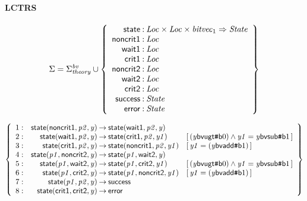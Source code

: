 \documentclass[a4paper]{article}
\newcommand{\ttsym}[1]{\mbox{\tt #1}}
\def\ttsharp{\ttsym{\symbol{35}}}
\newcommand{\Sort}[1]{\mathit{#1}}
\newcommand{\symb}[1]{\mathsf{#1}}
\newcommand{\var}[1]{\mathit{#1}}
\newcommand{\Constraint}[1]{[\, #1 \,]}
\newcommand{\bv}[2][b]{{\ttsharp\symb{#1}{#2}}}
\newcommand{\Sigmabvtheory}{\Sigma^{\mathit{bv}}_{\mathit{theory}}}
\begin{document}
\paragraph{LCTRS}

\[
\Sigma = 
\Sigmabvtheory \cup\left\{
\begin{array}{r@{\>}c@{\>}l}
\symb{state} & : & \Sort{Loc} \times \Sort{Loc} \times \Sort{bitvec}_{1} \Rightarrow \Sort{State}\\
\symb{noncrit1} & : & \Sort{Loc}\\
\symb{wait1} & : & \Sort{Loc}\\
\symb{crit1} & : & \Sort{Loc}\\
\symb{noncrit2} & : & \Sort{Loc}\\
\symb{wait2} & : & \Sort{Loc}\\
\symb{crit2} & : & \Sort{Loc}\\
\symb{success} & : & \Sort{State}\\
\symb{error} & : & \Sort{State}\\
\end{array}
\right\}
\]

\[
\left\{
\begin{array}{rr@{\>}c@{\>}ll}
\mathrm{1} : 
 & \symb{state}(\symb{noncrit1},\var{p2},\var{y})
 & \to 
 & \symb{state}(\symb{wait1},\var{p2},\var{y})\\

\mathrm{2} : 
 & \symb{state}(\symb{wait1},\var{p2},\var{y})
 & \to 
 & \symb{state}(\symb{crit1},\var{p2},\var{y1})
 & \Constraint{(\var{y} \symb{bvugt} \bv{0}) \land \var{y1} = \var{y} \symb{bvsub} \bv{1}}\\

\mathrm{3} : 
 & \symb{state}(\symb{crit1},\var{p2},\var{y})
 & \to 
 & \symb{state}(\symb{noncrit1},\var{p2},\var{y1})
 & \Constraint{\var{y1} = (\var{y} \symb{bvadd} \bv{1})}\\

\mathrm{4} : 
 & \symb{state}(\var{p1},\symb{noncrit2},\var{y})
 & \to 
 & \symb{state}(\var{p1},\symb{wait2},\var{y})\\

\mathrm{5} : 
 & \symb{state}(\var{p1},\symb{wait2},\var{y})
 & \to 
 & \symb{state}(\var{p1},\symb{crit2},\var{y1})
 & \Constraint{(\var{y} \symb{bvugt} \bv{0}) \land \var{y1} = \var{y} \symb{bvsub} \bv{1}}\\

\mathrm{6} : 
 & \symb{state}(\var{p1},\symb{crit2},\var{y})
 & \to 
 & \symb{state}(\var{p1},\symb{noncrit2},\var{y1})
 & \Constraint{\var{y1} = (\var{y} \symb{bvadd} \bv{1})}\\

\mathrm{7} : 
 & \symb{state}(\var{p1},\var{p2},\var{y})
 & \to 
 & \symb{success}\\

\mathrm{8} : 
 & \symb{state}(\symb{crit1},\symb{crit2},\var{y})
 & \to 
 & \symb{error}\\

\end{array}
\right\}
\]
\end{document}
